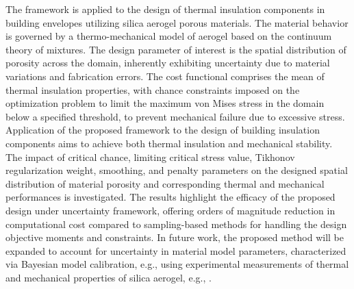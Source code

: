 \documentclass[pdf-a,balance,colorlinks,upint,subscriptcorrection,varvw,mathalfa=cal=boondoxo, spanish,french,vietnamese,russian,greek]{asmeconf}
\begin{document}
%

The framework is applied to the design of thermal insulation components in building envelopes utilizing silica aerogel porous materials. The material behavior is governed by a thermo-mechanical model of aerogel based on the continuum theory of mixtures. The design parameter of interest is the spatial distribution of porosity across the domain, inherently exhibiting uncertainty due to material variations and fabrication errors.
The cost functional comprises the mean of thermal insulation properties, with chance constraints imposed on the optimization problem to limit the maximum von Mises stress in the domain below a specified threshold, to prevent mechanical failure due to excessive stress. Application of the proposed framework to the design of building insulation components aims to achieve both thermal insulation and mechanical stability. The impact of critical chance, limiting critical stress value, Tikhonov regularization weight, smoothing, and penalty parameters on the designed spatial distribution of material porosity and corresponding thermal and mechanical performances is investigated. The results highlight the efficacy of the proposed design under uncertainty framework, offering orders of magnitude reduction in computational cost compared to sampling-based methods for handling the design objective moments and constraints.
In future work, the proposed method will be expanded to account for uncertainty in material model parameters, characterized via Bayesian model calibration, e.g., \cite{tan2022predictive, liang2023bayesian, tan2022toward, lima2021bayesian, tan2021predictive} using experimental measurements of thermal and mechanical properties of silica aerogel, e.g., \cite{an2021wearable}.




\end{document}
